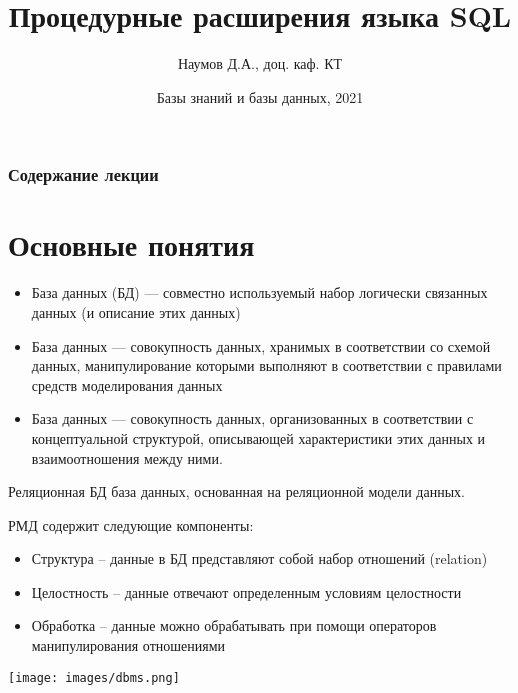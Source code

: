 \documentclass{beamer}
\title[СУБД]{Процедурные расширения языка SQL}
\author{Наумов Д.А., доц. каф. КТ}
\date[29.03.2021] {Базы знаний и базы данных, 2021}
\begin{document}
\begin{frame}
  \titlepage
\end{frame}
  
\begin{frame}
  \frametitle{Содержание лекции}
  \tableofcontents  
\end{frame}
  
\section{Основные понятия}
\begin{frame}
	\begin{itemize}
		\item База данных (БД) — совместно используемый набор логически связанных данных (и описание этих данных)
		\item База данных — совокупность данных, хранимых в соответствии со схемой данных, манипулирование которыми выполняют в соответствии с правилами средств моделирования данных 
		\item База данных — совокупность данных, организованных в соответствии с концептуальной структурой, описывающей характеристики этих данных и взаимоотношения между ними.
	\end{itemize}
\end{frame} 

\begin{frame}
	\begin{block}{Реляционная БД}
		база данных, основанная на реляционной модели данных.
	\end{block}
	РМД содержит следующие компоненты:
	\begin{itemize}
		\item Структура – данные в БД представляют собой набор отношений (relation) 
		\item Целостность – данные отвечают определенным условиям целостности
		\item Обработка – данные можно обрабатывать при помощи операторов манипулирования отношениями
	\end{itemize}
\end{frame} 

\begin{frame}
	\begin{center}
		\texttt{[image: images/dbms.png]}
	\end{center}
\end{frame} 
\end{document}
